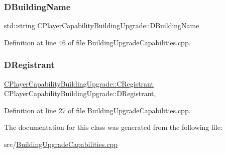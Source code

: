 \subsubsection{\texorpdfstring{D\+Building\+Name}{DBuildingName}}
{\footnotesize\ttfamily std\+::string C\+Player\+Capability\+Building\+Upgrade\+::\+D\+Building\+Name\hspace{0.3cm}{\ttfamily [protected]}}



Definition at line 46 of file Building\+Upgrade\+Capabilities.\+cpp.

\hypertarget{classCPlayerCapabilityBuildingUpgrade_abbc814330c1c8e96abb2f0c512e8abb3}{}\label{classCPlayerCapabilityBuildingUpgrade_abbc814330c1c8e96abb2f0c512e8abb3} 
\subsubsection{\texorpdfstring{D\+Registrant}{DRegistrant}}
{\footnotesize\ttfamily \hyperlink{classCPlayerCapabilityBuildingUpgrade_1_1CRegistrant}{C\+Player\+Capability\+Building\+Upgrade\+::\+C\+Registrant} C\+Player\+Capability\+Building\+Upgrade\+::\+D\+Registrant\hspace{0.3cm}{\ttfamily [static]}, {\ttfamily [protected]}}



Definition at line 27 of file Building\+Upgrade\+Capabilities.\+cpp.



The documentation for this class was generated from the following file\+:\begin{DoxyCompactItemize}
\item 
src/\hyperlink{BuildingUpgradeCapabilities_8cpp}{Building\+Upgrade\+Capabilities.\+cpp}\end{DoxyCompactItemize}
